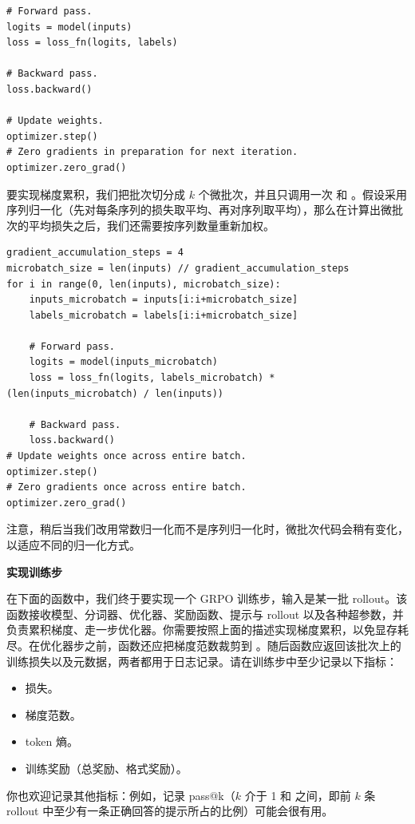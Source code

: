\begin{lstlisting}
# Forward pass.
logits = model(inputs)
loss = loss_fn(logits, labels)

# Backward pass.
loss.backward()

# Update weights.
optimizer.step()
# Zero gradients in preparation for next iteration.
optimizer.zero_grad()
\end{lstlisting}

要实现梯度累积，我们把批次切分成 $k$ 个微批次，并且只调用一次  和 。假设采用序列归一化（先对每条序列的损失取平均、再对序列取平均），那么在计算出微批次的平均损失之后，我们还需要按序列数量重新加权。

\begin{lstlisting}
gradient_accumulation_steps = 4
microbatch_size = len(inputs) // gradient_accumulation_steps
for i in range(0, len(inputs), microbatch_size):
    inputs_microbatch = inputs[i:i+microbatch_size]
    labels_microbatch = labels[i:i+microbatch_size]

    # Forward pass.
    logits = model(inputs_microbatch)
    loss = loss_fn(logits, labels_microbatch) * (len(inputs_microbatch) / len(inputs))

    # Backward pass.
    loss.backward()
# Update weights once across entire batch.
optimizer.step()
# Zero gradients once across entire batch.
optimizer.zero_grad()
\end{lstlisting}

注意，稍后当我们改用常数归一化而不是序列归一化时，微批次代码会稍有变化，以适应不同的归一化方式。

\medskip
\noindent\textbf{实现训练步}\par\medskip

在下面的函数中，我们终于要实现一个 GRPO 训练步，输入是某一批 rollout。该函数接收模型、分词器、优化器、奖励函数、提示与 rollout 以及各种超参数，并负责累积梯度、走一步优化器。你需要按照上面的描述实现梯度累积，以免显存耗尽。在优化器步之前，函数还应把梯度范数裁剪到 。随后函数应返回该批次上的训练损失以及元数据，两者都用于日志记录。请在训练步中至少记录以下指标：
\begin{itemize}
  \item 损失。
  \item 梯度范数。
  \item token 熵。
  \item 训练奖励（总奖励、格式奖励）。
\end{itemize}
你也欢迎记录其他指标：例如，记录 pass@k（$k$ 介于 1 和  之间，即前 $k$ 条 rollout 中至少有一条正确回答的提示所占的比例）可能会很有用。

